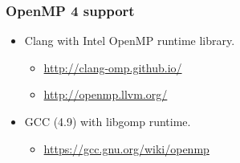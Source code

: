\begin{frame}[fragile]
  \frametitle{OpenMP 4 support}
  \begin{itemize}
  \item Clang with Intel OpenMP runtime library.
    \begin{itemize}
    \item \url{http://clang-omp.github.io/}
    \item \url{http://openmp.llvm.org/}
    \end{itemize}
  \item GCC (4.9) with libgomp runtime.
    \begin{itemize}
    \item \url{https://gcc.gnu.org/wiki/openmp}
    \end{itemize}
  \end{itemize}
\end{frame}
